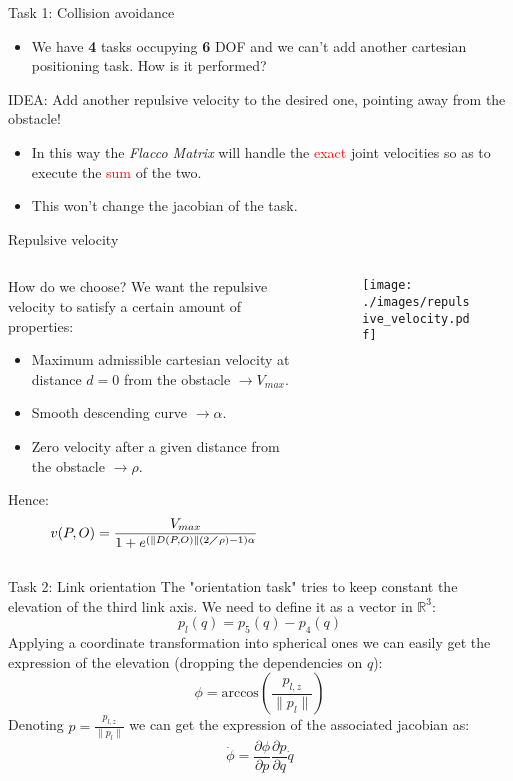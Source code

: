 \documentclass[11pt]{beamer}
\newcommand{\norm}[1]{\parallel{#1}\parallel}
\newcommand{\R}{\mathbb{R}}
\newcommand{\diff}[2]{\frac{\partial{#1}}{\partial{#2}}}
\begin{document}
\begin{frame}{Task 1: Collision avoidance}
\begin{itemize}
\item We have \textbf{4} tasks occupying \textbf{6} DOF and we can't add another cartesian positioning task. How is it performed?
\end{itemize}
\begin{block}{IDEA:}
Add another repulsive velocity to the desired one, pointing away from the obstacle! 
\end{block}
\begin{itemize}
\item In this way the \emph{Flacco Matrix} will handle the \textcolor{red}{exact} joint velocities so as to execute the \textcolor{red}{sum} of the two.
\item This won't change the jacobian of the task.
\end{itemize}
\end{frame}

\begin{frame}{Repulsive velocity}
\begin{columns}
\begin{column}{.5\textwidth}
\begin{block}{How do we choose?}
We want the repulsive velocity to satisfy a certain amount of properties:
\begin{itemize}
\item Maximum admissible cartesian velocity at distance $d=0$ from the obstacle $\rightarrow V_{max}$.
\item Smooth descending curve $\rightarrow \alpha$.
\item Zero velocity after a given distance from the obstacle $\rightarrow \rho$.
\end{itemize}
\end{block} 
Hence:
\[
v(P,O) = \frac{V_{max}}{1+e^{(\norm{D(P,O)}(2\diagup\rho)-1)\alpha}}
\]
\end{column}
\begin{column}{.5\textwidth}
\begin{figure}[H]
\texttt{[image: ./images/repulsive\_velocity.pdf]}
\end{figure}
\end{column}
\end{columns}
\end{frame}

\begin{frame}{Task 2: Link orientation}
The "orientation task" tries to keep constant the elevation of the third link axis. We need to define it as a vector in $\R^3$:
\[
p_l(q) = p_5(q) - p_4(q)
\]
Applying a coordinate transformation into spherical ones we can easily get the expression of the elevation (dropping the dependencies on $q$):
\[
\phi = \mathrm{arccos}(\frac{p_{l,z}}{\norm{p_l}})
\]
Denoting $p = \frac{p_{l,z}}{\norm{p_l}}$ we can get the expression of the associated jacobian as:
\[
\dot{\phi} = \diff{\phi}{p}\diff{p}{q}\dot{q}
\]
\end{frame}
\end{document}
